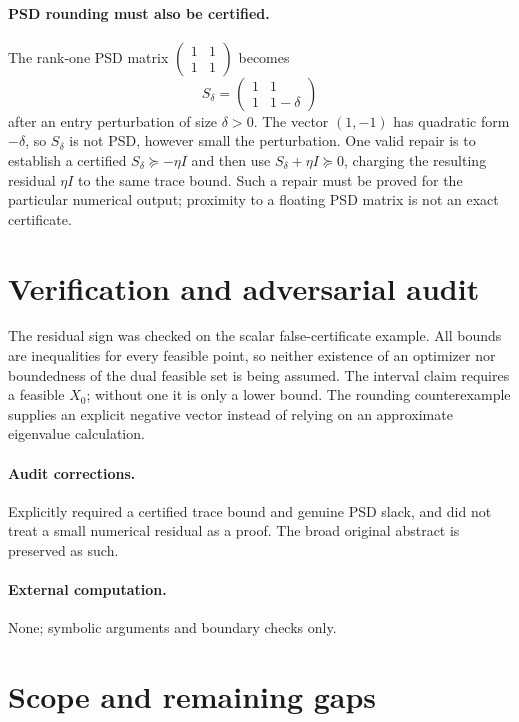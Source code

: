 \documentclass[11pt]{article}
\begin{document}
\paragraph{PSD rounding must also be certified.}
The rank-one PSD matrix $\left(\begin{smallmatrix}1&1\\1&1\end{smallmatrix}\right)$
becomes
\[
 S_\delta=\begin{pmatrix}1&1\\1&1-\delta\end{pmatrix}
\]
after an entry perturbation of size $\delta>0$.
The vector $(1,-1)$ has quadratic form $-\delta$, so $S_\delta$ is not PSD,
however small the perturbation. One valid repair is to establish a certified
$S_\delta\succeq-\eta I$ and then use $S_\delta+\eta I\succeq0$, charging
the resulting residual $\eta I$ to the same trace bound. Such a repair must
be proved for the particular numerical output; proximity to a floating PSD
matrix is not an exact certificate.

\section{Verification and adversarial audit}

The residual sign was checked on the scalar false-certificate example. All bounds
are inequalities for every feasible point, so neither existence of an optimizer
nor boundedness of the dual feasible set is being assumed. The interval claim
requires a feasible $X_0$; without one it is only a lower bound. The rounding
counterexample supplies an explicit negative vector instead of relying on an
approximate eigenvalue calculation.

\paragraph{Audit corrections.} Explicitly required a certified trace bound and genuine PSD slack, and did
not treat a small numerical residual as a proof. The broad original abstract is
preserved as such.
\paragraph{External computation.} None; symbolic arguments and boundary checks only.
\section{Scope and remaining gaps}
\end{document}
